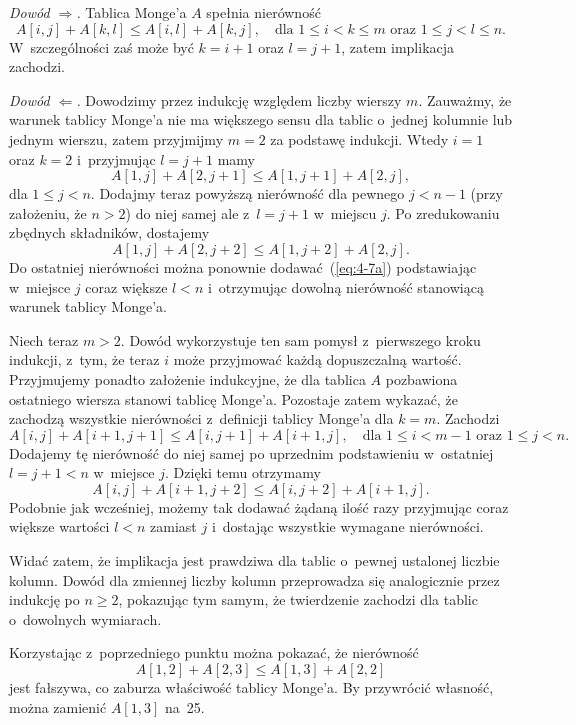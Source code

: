 
\subproblem %
\noindent\emph{Dowód $\Rightarrow$.} Tablica Monge'a $A$ spełnia nierówność
\[
	A[i,j]+A[k,l] \le A[i,l]+A[k,j], \quad\text{dla $1\le i<k\le m$ oraz $1\le j<l\le n$}.
\]
W~szczególności zaś może być $k=i+1$ oraz $l=j+1$, zatem implikacja zachodzi.
\bigskip

\noindent\emph{Dowód $\Leftarrow$.} Dowodzimy przez indukcję względem liczby wierszy $m$. Zauważmy, że warunek tablicy Monge'a nie ma większego sensu dla tablic o~jednej kolumnie lub jednym wierszu, zatem przyjmijmy $m=2$ za podstawę indukcji. Wtedy $i=1$ oraz $k=2$ i~przyjmując $l=j+1$ mamy
\begin{equation}
	A[1,j]+A[2,j+1] \le A[1,j+1]+A[2,j], \label{eq:4-7a}
\end{equation}
dla $1\le j<n$. Dodajmy teraz powyższą nierówność dla pewnego $j<n-1$ (przy założeniu, że $n>2$) do niej samej ale z~$l=j+1$ w~miejscu $j$. Po zredukowaniu zbędnych składników, dostajemy
\[
	A[1,j]+A[2,j+2] \le A[1,j+2]+A[2,j].
\]
Do ostatniej nierówności można ponownie dodawać~(\ref{eq:4-7a}) podstawiając w~miejsce $j$ coraz większe $l<n$ i~otrzymując dowolną nierówność stanowiącą warunek tablicy Monge'a.

Niech teraz $m>2$. Dowód wykorzystuje ten sam pomysł z~pierwszego kroku indukcji, z~tym, że teraz $i$ może przyjmować każdą dopuszczalną wartość. Przyjmujemy ponadto założenie indukcyjne, że dla tablica $A$ pozbawiona ostatniego wiersza stanowi tablicę Monge'a. Pozostaje zatem wykazać, że zachodzą wszystkie nierówności z~definicji tablicy Monge'a dla $k=m$. Zachodzi
\[
	A[i,j]+A[i+1,j+1] \le A[i,j+1]+A[i+1,j], \quad\text{dla $1\le i<m-1$ oraz $1\le j<n$}.
\]
Dodajemy tę nierówność do niej samej po uprzednim podstawieniu w~ostatniej $l=j+1<n$ w~miejsce $j$. Dzięki temu otrzymamy
\[
	A[i,j]+A[i+1,j+2] \le A[i,j+2]+A[i+1,j].
\]
Podobnie jak wcześniej, możemy tak dodawać żądaną ilość razy przyjmując coraz większe wartości $l<n$ zamiast $j$ i~dostając wszystkie wymagane nierówności.

Widać zatem, że implikacja jest prawdziwa dla tablic o~pewnej ustalonej liczbie kolumn. Dowód dla zmiennej liczby kolumn przeprowadza się analogicznie przez indukcję po $n\ge2$, pokazując tym samym, że twierdzenie zachodzi dla tablic o~dowolnych wymiarach.

\subproblem %
Korzystając z~poprzedniego punktu można pokazać, że nierówność
\[
	A[1,2]+A[2,3] \le A[1,3]+A[2,2]
\]
jest fałszywa, co zaburza właściwość tablicy Monge'a. By przywrócić własność, można zamienić $A[1,3]$ na~25.

